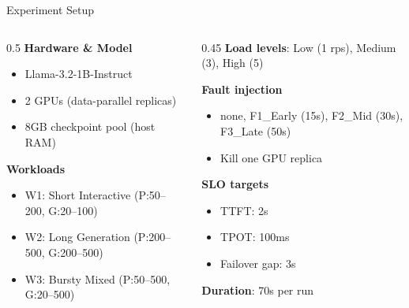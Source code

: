 \documentclass[aspectratio=169,12pt]{beamer}
\begin{document}
\begin{frame}{Experiment Setup}
\begin{columns}[T]
\begin{column}{0.5\textwidth}
\textbf{Hardware \& Model}
\begin{itemize}
    \item Llama-3.2-1B-Instruct
    \item 2 GPUs (data-parallel replicas)
    \item 8GB checkpoint pool (host RAM)
\end{itemize}

\vspace{0.5em}
\textbf{Workloads}
\begin{itemize}
    \item W1: Short Interactive (P:50--200, G:20--100)
    \item W2: Long Generation (P:200--500, G:200--500)
    \item W3: Bursty Mixed (P:50--500, G:20--500)
\end{itemize}
\end{column}
\begin{column}{0.45\textwidth}
\textbf{Load levels}: Low (1 rps), Medium (3), High (5)

\vspace{0.5em}
\textbf{Fault injection}
\begin{itemize}
    \item none, F1\_Early (15s), F2\_Mid (30s), F3\_Late (50s)
    \item Kill one GPU replica
\end{itemize}

\vspace{0.5em}
\textbf{SLO targets}
\begin{itemize}
    \item TTFT: 2s
    \item TPOT: 100ms
    \item Failover gap: 3s
\end{itemize}

\vspace{0.5em}
\textbf{Duration}: 70s per run
\end{column}
\end{columns}
\end{frame}
\end{document}
